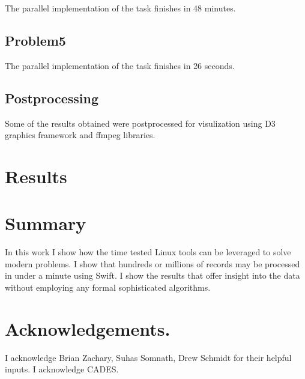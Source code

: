 \documentclass{article}
\begin{document}
The parallel implementation of the task finishes in 48 minutes.
\subsection*{Problem5}
The parallel implementation of the task finishes in 26 seconds.

\subsection*{Postprocessing}
Some of the results obtained were postprocessed for visulization using D3
graphics framework and ffmpeg libraries.

\section*{Results}

\section*{Summary}
In this work I show how the time tested Linux tools can be leveraged to solve
modern problems. I show that hundreds or millions of records may be processed
in under a minute using Swift. I show the results that offer insight into the
data without employing any formal sophisticated algorithms.

\section*{Acknowledgements.}
I acknowledge Brian Zachary, Suhas Somnath, Drew Schmidt for their helpful
inputs. I acknowledge CADES.
\end{document}
